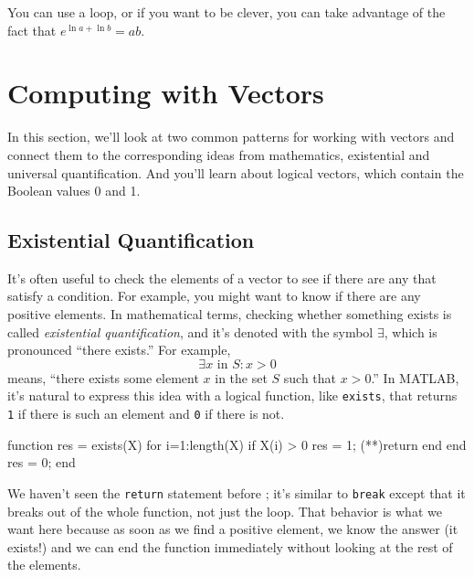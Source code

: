 You can use a loop, or if you want to be clever, you can take
advantage of the fact that $e^{\ln a + \ln b} = a b$.




\section{Computing with Vectors}

In this section, we'll look at two common patterns for working with vectors and connect them to the corresponding ideas from mathematics, existential and universal quantification.  And you'll learn about logical vectors, which contain the Boolean values 0 and 1. 

\subsection{Existential Quantification}


It's often useful to check the elements of a vector to see if there
are any that satisfy a condition.  For example, you might want to
know if there are any positive elements.  In mathematical terms, checking whether something exists is called \emph{existential quantification}, and it's denoted with
the symbol $\exists$, which is pronounced ``there exists.''  For example,
%
\[ \exists x \mbox{~in~} S: x>0  \]
%
means, ``there exists some element $x$ in the set $S$ such that
$x>0$.''  In MATLAB, it's natural to express this idea with a logical
function, like \lstinline{exists}, that returns \lstinline{1} if there is such an
element and \lstinline{0} if there is not.

\begin{code}
function res = exists(X)
    for i=1:length(X)
        if X(i) > 0
            res = 1;
            (**)return
        end
    end
    res = 0;
end
\end{code}

We haven't seen the \lstinline{return} statement before ; it's similar
to \lstinline{break} except that it breaks out of the whole function, not
just the loop.  That behavior is what we want here because as soon
as we find a positive element, we know the answer (it exists!) and
we can end the function immediately without looking at the rest
of the elements.

